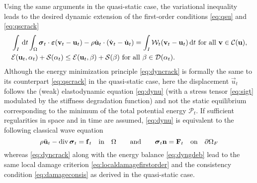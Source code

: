 Using the same arguments in the quasi-static case, the variational inequality leads to the desired dynamic extension of the first-order conditions \eqref{eq:qsu} and \eqref{eq:qscrack}
\begin{subequations}
\begin{align}
& \int_I\D{t}\int_\Omega\sig_t\cdot\eps(\vec{v}_t-\vec{u}_t)-\rho\dot{\vec{u}}_t\cdot(\dot{\vec{v}}_t-\dot{\vec{u}}_t)=\int_I\mathcal{W}_t(\vec{v}_t-\vec{u}_t)\D{t}\text{ for all $\vec{v}\in\mathcal{C}(\vec{u})$}, \label{eq:dynu} \\
& \mathcal{E}(\vec{u}_t,\alpha_t)+\mathcal{S}(\alpha_t)\leq \mathcal{E}(\vec{u}_t,\beta)+\mathcal{S}(\beta)\text{ for all $\beta\in\mathcal{D}(\alpha_t)$}. \label{eq:dyncrack}
\end{align}
\end{subequations}
Although the energy minimization principle \eqref{eq:dyncrack} is formally the same to its counterpart \eqref{eq:qscrack} in the quasi-static case, here the displacement $\vec{u}_t$ follows the (weak) elastodynamic equation \eqref{eq:dynu} (with a stress tensor \eqref{eq:sigt} modulated by the stiffness degradation function) and not the static equilibrium corresponding to the minimum of the total potential energy $\mathcal{P}_t$. If sufficient regularities in space and in time are assumed, \eqref{eq:dynu} is equivalent to the following classical wave equation
\begin{equation} \label{eq:wavedyn}
\rho\ddot{\vec{u}}_t-\div\sig_t=\vec{f}_t\quad\text{in}\quad\Omega\qquad\text{and}\qquad\sig_t\vec{n}=\vec{F}_t\quad\text{on}\quad\partial\Omega_F
\end{equation}
whereas \eqref{eq:dyncrack} along with the energy balance \eqref{eq:dyngdeb} lead to the same local damage criterion \eqref{eq:localdamagefirstorder} and the consistency condition \eqref{eq:damageconsis} as derived in the quasi-static case.

